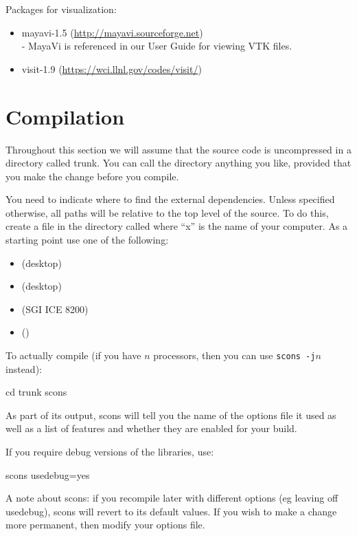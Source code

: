 Packages for visualization:
\begin{itemize}
 \item mayavi-1.5 (\url{http://mayavi.sourceforge.net}) \\-
    MayaVi is referenced in our User Guide for viewing VTK files.
 \item visit-1.9 (\url{https://wci.llnl.gov/codes/visit/})
\end{itemize}

\section{Compilation}\label{sec:compilesrc}
Throughout this section we will assume that the source code is uncompressed in a directory called trunk.
You can call the directory anything you like, provided that you make the change before you compile.

You need to indicate where to find the external dependencies.
Unless specified otherwise, all paths will be relative to the top level of the source.
To do this, create a file in the  directory called  where ``x'' is the name of your computer.
As a starting point use one of the following:
\begin{itemize}
 \item {} (\linux desktop)
\item {} (\macosx desktop)
\item {} (SGI ICE 8200)
\item {} (\winxp)
\end{itemize}

To actually compile (if you have $n$ processors, then you can use \texttt{scons -j$n$} instead):

\begin{shellCode}
cd trunk
scons
\end{shellCode}

As part of its output, scons will tell you the name of the options file it used as well as a list of features 
and whether they are enabled for your build.

If you require debug versions of the libraries, use:
\begin{shellCode}
 scons usedebug=yes
\end{shellCode}
A note about scons: if you recompile later with different options (eg leaving off usedebug), scons will revert 
to its default values. If you wish to make a change more permanent, then modify your options file.


